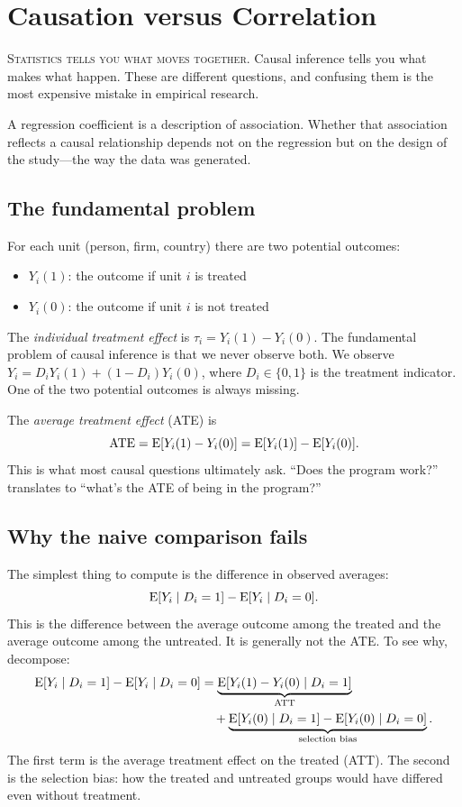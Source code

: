 \chapter{Causation versus Correlation}
\label{ch:causal}

\noindent\textsc{Statistics tells you what moves together.} Causal inference tells you what makes what happen. These are different questions, and confusing them is the most expensive mistake in empirical research.

A regression coefficient is a description of association. Whether that association reflects a causal relationship depends not on the regression but on the design of the study---the way the data was generated.

\section{The fundamental problem}

For each unit (person, firm, country) there are two potential outcomes:
\begin{itemize}[noitemsep]
\item $Y_i(1)$: the outcome if unit $i$ is treated
\item $Y_i(0)$: the outcome if unit $i$ is not treated
\end{itemize}
The \emph{individual treatment effect} is $\tau_i = Y_i(1) - Y_i(0)$. The fundamental problem of causal inference is that we never observe both. We observe $Y_i = D_i Y_i(1) + (1 - D_i)Y_i(0)$, where $D_i \in \{0, 1\}$ is the treatment indicator. One of the two potential outcomes is always missing.

The \emph{average treatment effect} (ATE) is
\begin{equation}
  \text{ATE} = \operatorname{E}[Y_i(1) - Y_i(0)] = \operatorname{E}[Y_i(1)] - \operatorname{E}[Y_i(0)].
  \label{eq:ate}
\end{equation}
This is what most causal questions ultimately ask. ``Does the program work?'' translates to ``what's the ATE of being in the program?''

\section{Why the naive comparison fails}

The simplest thing to compute is the difference in observed averages:
\[
  \operatorname{E}[Y_i \mid D_i = 1] - \operatorname{E}[Y_i \mid D_i = 0].
\]
This is the difference between the average outcome among the treated and the average outcome among the untreated. It is generally not the ATE. To see why, decompose:
\begin{align}
  \operatorname{E}[Y_i \mid D_i = 1] - \operatorname{E}[Y_i \mid D_i = 0]
    &= \underbrace{\operatorname{E}[Y_i(1) - Y_i(0) \mid D_i = 1]}_{\text{ATT}} \notag \\
    &\quad + \underbrace{\operatorname{E}[Y_i(0) \mid D_i = 1] - \operatorname{E}[Y_i(0) \mid D_i = 0]}_{\text{selection bias}}.
  \label{eq:naive-decomposition}
\end{align}
The first term is the average treatment effect on the treated (ATT). The second is the selection bias: how the treated and untreated groups would have differed even without treatment.

